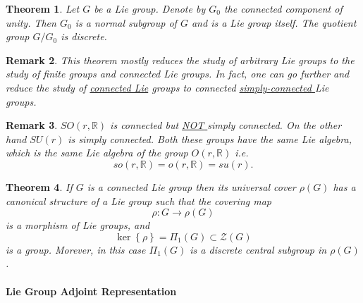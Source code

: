 \documentclass[aps,preprint]{revtex4}%
\newtheorem{theorem}{Theorem}
\newtheorem{remark}[theorem]{Remark}
\begin{document}
\begin{theorem}
Let $G$ be a Lie group. Denote by $G_{0}$ the connected component of unity.
Then $G_{0}$ is a \emph{normal subgroup} of $G$ and is a Lie group itself. The
quotient group $G/G_{0}$ is discrete.
\end{theorem}

\begin{remark}
This theorem mostly reduces the study of \emph{arbitrary Lie groups} to the
s\emph{tudy of finite groups and connected Lie groups}. In fact, one can go
further and \emph{reduce the study of \underline{\emph{connected Lie}} groups
to connected \underline{\emph{simply-connected }}Lie groups}.
\end{remark}

\begin{remark}
$SO\left(  r,\mathbb{R}\right)  $ \emph{is connected but \underline{\emph{NOT}%
} simply connected. On the other hand }$SU\left(  r\right)  $ is \emph{simply
connected. Both these groups have the same Lie algebra, which is the same Lie
algebra of the group }$O\left(  r,\mathbb{R}\right)  $ i.e.
\begin{equation}
so\left(  r,\mathbb{R}\right)  =o\left(  r,\mathbb{R}\right)  =su\left(
r\right)  .
\end{equation}

\end{remark}

\begin{theorem}
If $G$ is a connected Lie group then its universal cover $\mathcal{\rho
}\left(  G\right)  $ has a canonical structure of a Lie group such that the
covering map%
\begin{equation}
\mathcal{\rho}:G\rightarrow\mathcal{\rho}\left(  G\right)
\end{equation}
is a morphism of Lie groups, and
\begin{equation}
\ker\left\{  \mathcal{\rho}\right\}  =\Pi_{1}\left(  G\right)  \subset
\mathcal{Z}\left(  G\right)
\end{equation}
is a group. Morever, in this case $\Pi_{1}\left(  G\right)  $ is a discrete
central subgroup in $\mathcal{\rho}\left(  G\right)  $.
\end{theorem}

\paragraph{Lie Group Adjoint Representation}
\end{document}
